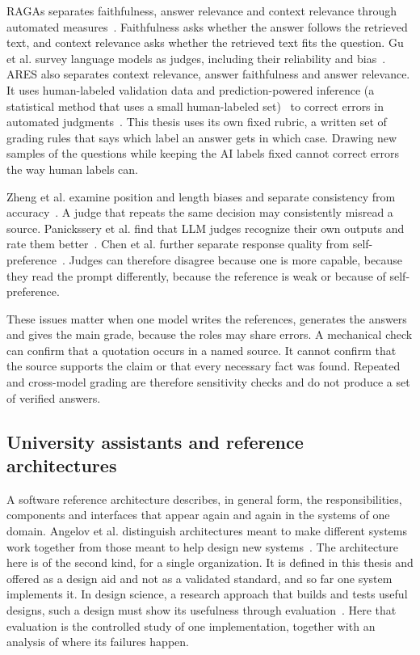 RAGAs separates faithfulness, answer relevance and context relevance through automated measures~\cite{es2024ragas}. Faithfulness asks whether the answer follows the retrieved text, and context relevance asks whether the retrieved text fits the question. Gu et al. survey language models as judges, including their reliability and bias~\cite{gu2024llmjudge}. ARES also separates context relevance, answer faithfulness and answer relevance. It uses human-labeled validation data and prediction-powered inference (a statistical method that uses a small human-labeled set)~\cite{angelopoulos2023ppi} to correct errors in automated judgments~\cite{saadfalcon2024ares}. This thesis uses its own fixed rubric, a written set of grading rules that says which label an answer gets in which case. Drawing new samples of the questions while keeping the AI labels fixed cannot correct errors the way human labels can.

Zheng et al. examine position and length biases and separate consistency from accuracy~\cite{zheng2023judge}. A judge that repeats the same decision may consistently misread a source. Panickssery et al. find that LLM judges recognize their own outputs and rate them better~\cite{panickssery2024selfpreference}. Chen et al. further separate response quality from self-preference~\cite{chen2025selfpreference}. Judges can therefore disagree because one is more capable, because they read the prompt differently, because the reference is weak or because of self-preference.

These issues matter when one model writes the references, generates the answers and gives the main grade, because the roles may share errors. A mechanical check can confirm that a quotation occurs in a named source. It cannot confirm that the source supports the claim or that every necessary fact was found. Repeated and cross-model grading are therefore sensitivity checks and do not produce a set of verified answers.

\subsection{University assistants and reference architectures}

A software reference architecture describes, in general form, the responsibilities, components and interfaces that appear again and again in the systems of one domain. Angelov et al. distinguish architectures meant to make different systems work together from those meant to help design new systems~\cite{angelov2012reference}. The architecture here is of the second kind, for a single organization. It is defined in this thesis and offered as a design aid and not as a validated standard, and so far one system implements it. In design science, a research approach that builds and tests useful designs, such a design must show its usefulness through evaluation~\cite{hevner2004design}. Here that evaluation is the controlled study of one implementation, together with an analysis of where its failures happen.

